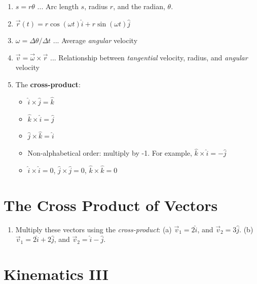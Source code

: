 \documentclass{article}
\begin{document}
\begin{enumerate}
\item $s = r\theta$ ... Arc length $s$, radius $r$, and the radian, $\theta$.
\item $\vec{r}(t) = r \cos(\omega t) \hat{i} + r \sin(\omega t) \hat{j}$
\item $\omega = \Delta \theta / \Delta t$ ... Average \textit{angular} velocity
\item $\vec{v} = \vec{\omega} \times \vec{r}$ ... Relationship between \textit{tangential} velocity, radius, and \textit{angular} velocity
\item The \textbf{cross-product}:
\begin{itemize}
\item $\hat{i} \times \hat{j} = \hat{k}$
\item $\hat{k} \times \hat{i} = \hat{j}$
\item $\hat{j} \times \hat{k} = \hat{i}$
\item Non-alphabetical order: multiply by -1. For example, $\hat{k} \times \hat{i} = -\hat{j}$
\item $\hat{i} \times \hat{i} = 0$, $\hat{j} \times \hat{j} = 0$, $\hat{k} \times \hat{k} = 0$
\end{itemize}
\end{enumerate}

\section{The Cross Product of Vectors}

\begin{enumerate}
\item Multiply these vectors using the \textit{cross-product}: (a) $\vec{v}_1 = 2 \hat{i}$, and $\vec{v}_2 = 3\hat{j}$. (b) $\vec{v}_1 = 2 \hat{i} + 2 \hat{j}$, and $\vec{v}_2 = \hat{i} - \hat{j}$. \\ \vspace{0.5cm}
\end{enumerate}

\section{Kinematics III}
\end{document}
